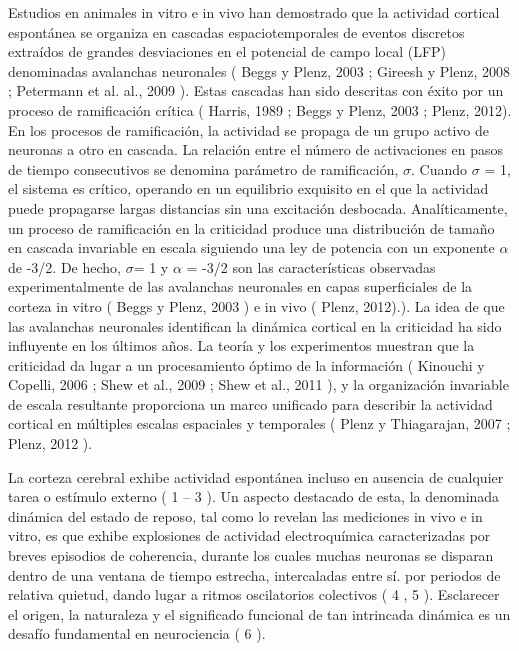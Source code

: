 Estudios en animales in vitro e in vivo han demostrado que la actividad cortical espontánea se organiza en cascadas espaciotemporales de eventos discretos extraídos de grandes desviaciones en el potencial de campo local (LFP) denominadas avalanchas neuronales ( Beggs y Plenz, 2003 ; Gireesh y Plenz, 2008 ; Petermann et al. al., 2009 ). Estas cascadas han sido descritas con éxito por un proceso de ramificación crítica ( Harris, 1989 ; Beggs y Plenz, 2003 ; Plenz, 2012). En los procesos de ramificación, la actividad se propaga de un grupo activo de neuronas a otro en cascada. La relación entre el número de activaciones en pasos de tiempo consecutivos se denomina parámetro de ramificación, $\sigma$. Cuando $\sigma$ = 1, el sistema es crítico, operando en un equilibrio exquisito en el que la actividad puede propagarse largas distancias sin una excitación desbocada. Analíticamente, un proceso de ramificación en la criticidad produce una distribución de tamaño en cascada invariable en escala siguiendo una ley de potencia con un exponente $\alpha$ de -3/2. De hecho, $\sigma$= 1 y $\alpha$ = -3/2 son las características observadas experimentalmente de las avalanchas neuronales en capas superficiales de la corteza in vitro ( Beggs y Plenz, 2003 ) e in vivo ( Plenz, 2012).). La idea de que las avalanchas neuronales identifican la dinámica cortical en la criticidad ha sido influyente en los últimos años. La teoría y los experimentos muestran que la criticidad da lugar a un procesamiento óptimo de la información ( Kinouchi y Copelli, 2006 ; Shew et al., 2009 ; Shew et al., 2011 ), y la organización invariable de escala resultante proporciona un marco unificado para describir la actividad cortical en múltiples escalas espaciales y temporales ( Plenz y Thiagarajan, 2007 ; Plenz, 2012 ).

La corteza cerebral exhibe actividad espontánea incluso en ausencia de cualquier tarea o estímulo externo ( 1 – 3 ). Un aspecto destacado de esta, la denominada dinámica del estado de reposo, tal como lo revelan las mediciones in vivo e in vitro, es que exhibe explosiones de actividad electroquímica caracterizadas por breves episodios de coherencia, durante los cuales muchas neuronas se disparan dentro de una ventana de tiempo estrecha, intercaladas entre sí. por periodos de relativa quietud, dando lugar a ritmos oscilatorios colectivos ( 4 , 5 ). Esclarecer el origen, la naturaleza y el significado funcional de tan intrincada dinámica es un desafío fundamental en neurociencia ( 6 ).

